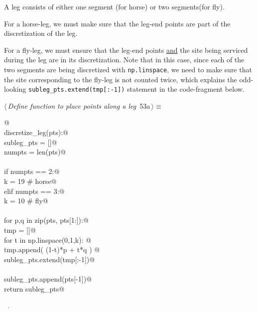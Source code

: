 \documentclass[11.5pt]{report}
\begin{document}
A leg consists of either one segment (for horse) or two segments(for fly). 

For a horse-leg, we must make sure that the leg-end points are part of the discretization of the leg. 

For a fly-leg, we must ensure that the leg-end points \underline{and} the site being 
serviced during the leg are in its discretization. Note that in this case, 
since each of the two segments are being discretized with \verb|np.linspace|, we need
to make sure that the site corresponding to the fly-leg is not counted twice, which
explains the odd-looking \verb|subleg_pts.extend(tmp[:-1])| statement in the code-fragment below. 

\begin{flushleft} \small
\begin{minipage}{\linewidth}\label{scrap76}\raggedright\small
{} $\langle\,${\itshape Define function to place points along a leg}\nobreak\ {\footnotesize {53a}}$\,\rangle\equiv$
\vspace{-1ex}
\begin{list}{}{} \item
\mbox{}\verb@   @\\
\mbox{}\verb@def discretize_leg(pts):@\\
\mbox{}\verb@   subleg_pts = []@\\
\mbox{}\verb@   numpts     = len(pts)@\\
\mbox{}\verb@@\\
\mbox{}\verb@   if numpts == 2:@\\
\mbox{}\verb@       k  = 19 # horse@\\
\mbox{}\verb@   elif numpts == 3:@\\
\mbox{}\verb@       k  = 10 # fly@\\
\mbox{}\verb@@\\
\mbox{}\verb@   for p,q in zip(pts, pts[1:]):@\\
\mbox{}\verb@       tmp = []@\\
\mbox{}\verb@       for t in np.linspace(0,1,k): @\\
\mbox{}\verb@           tmp.append( (1-t)*p + t*q ) @\\
\mbox{}\verb@       subleg_pts.extend(tmp[:-1])@\\
\mbox{}\verb@@\\
\mbox{}\verb@   subleg_pts.append(pts[-1])@\\
\mbox{}\verb@   return subleg_pts@\\
\mbox{}\verb@@{\NWsep}
\end{list}
\vspace{-1.5ex}
\footnotesize
\begin{list}{}{\setlength{\itemsep}{-\parsep}\setlength{\itemindent}{-\leftmargin}}
\item \NWtxtMacroRefIn\ .

\item{}
\end{list}
\end{minipage}\vspace{4ex}
\end{flushleft}
\end{document}
